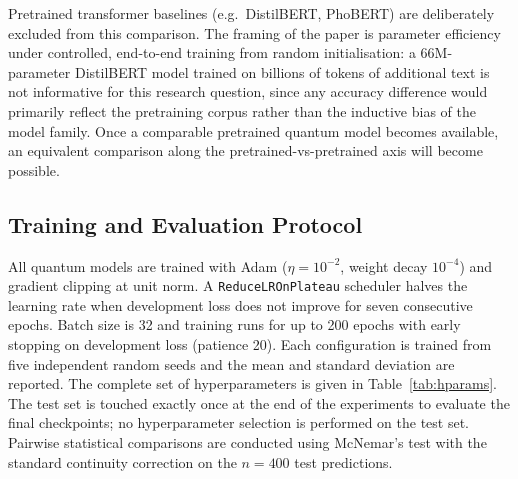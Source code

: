 \documentclass[11pt, a4paper]{article}
\begin{document}
Pretrained transformer baselines (e.g.\ DistilBERT, PhoBERT) are
deliberately excluded from this comparison. The framing of the paper
is parameter efficiency under controlled, end-to-end training from
random initialisation: a 66M-parameter DistilBERT model trained on
billions of tokens of additional text is not informative for this
research question, since any accuracy difference would primarily
reflect the pretraining corpus rather than the inductive bias of the
model family. Once a comparable pretrained quantum model becomes
available, an equivalent comparison along the
pretrained-vs-pretrained axis will become possible.

\subsection{Training and Evaluation Protocol}

All quantum models are trained with Adam \citep{kingma2015adam}
(\(\eta=10^{-2}\), weight decay \(10^{-4}\)) and gradient clipping at
unit norm. A \texttt{ReduceLROnPlateau} scheduler halves the learning
rate when development loss does not improve for seven consecutive
epochs. Batch size is 32 and training runs for up to 200 epochs with
early stopping on development loss (patience 20). Each configuration
is trained from five independent random seeds and the mean and
standard deviation are reported. The complete set of hyperparameters
is given in Table~\ref{tab:hparams}. The test set is touched exactly
once at the end of the experiments to evaluate the final checkpoints;
no hyperparameter selection is performed on the test set. Pairwise
statistical comparisons are conducted using McNemar's test
\citep{mcnemar1947} with the standard continuity correction on the
\(n=400\) test predictions.
\end{document}
